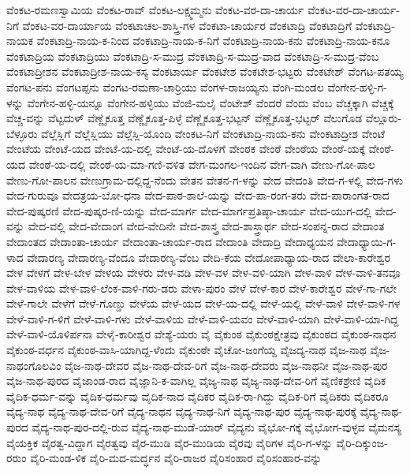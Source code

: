 ವೆಂಕಟ-ರಮಣಸ್ವಾಮಿಯ
ವೆಂಕಟ-ರಾವ್
ವೆಂಕಟ-ಲಕ್ಷ್ಮಮ್ಮನು
ವೆಂಕಟ-ವರ-ದಾ-ಚಾರ್ಯ
ವೆಂಕಟ-ವರ-ದಾ-ಚಾರ್ಯ-ನಿಗೆ
ವೆಂಕಟ-ವರ-ದಾರ್ಯಾಯ
ವೆಂಕಟಾಚಲ-ಶಾಸ್ತ್ರಿ-ಗಳ
ವೆಂಕಟಾ-ಚಾರ್ಯರ
ವೆಂಕಟಾದ್ರಿ
ವೆಂಕಟಾದ್ರಿಗೆ
ವೆಂಕಟಾದ್ರಿ-ನಾಯಕ
ವೆಂಕಟಾದ್ರಿ-ನಾಯ-ಕ-ನಿಂದ
ವೆಂಕಟಾದ್ರಿ-ನಾಯ-ಕ-ನಿಗೆ
ವೆಂಕಟಾದ್ರಿ-ನಾಯ-ಕನು
ವೆಂಕಟಾದ್ರಿ-ನಾಯ-ಕನೂ
ವೆಂಕಟಾದ್ರಿಯ
ವೆಂಕಟಾದ್ರಿಯು
ವೆಂಕಟಾದ್ರಿ-ಸ-ಮುದ್ರ
ವೆಂಕಟಾದ್ರಿ-ಸ-ಮುದ್ರ-ವಾದ
ವೆಂಕಟಾದ್ರಿ-ಸ-ಮುದ್ರ-ವೆಂಬ
ವೆಂಕಟಾದ್ರೀಶನ
ವೆಂಕಟಾದ್ರೀಶ-ನಾಯ-ಕಸ್ಯ
ವೆಂಕಟಾರ್ಯ
ವೆಂಕಟೇಶ
ವೆಂಕಟೇಶ-ಭಟ್ಟರು
ವೆಂಕಟೇಶ್
ವೆಂಗಟ-ಪತಯ್ಯ
ವೆಂಗಟ-ಪನು
ವೆಂಗಟಪ್ಪನು
ವೆಂಗಟ-ರಮಣಾ-ಚಾರ್ರಿಯು
ವೆಂಗಳ-ರಾಜಯ್ಯನು
ವೆಂಗಿ-ಮಂಡಲ
ವೆಂಗೇನ-ಹಳ್ಳಿ-ಗ-ಳನ್ನು
ವೆಂಗೇನ-ಹಳ್ಳಿ-ಯನ್ನೂ
ವೆಂಗೇನ-ಹಳ್ಳಿಯು
ವೆಂಜಿ-ಮಲೈ
ವೆಂಟೇಶ್
ವೆಂದರೆ
ವೆಂದು
ವೆಂಬ
ವೆಚ್ಚಕ್ಕಾಗಿ
ವೆಚ್ಚಕ್ಕೆ
ವೆಚ್ಚ-ವನ್ನು
ವೆಟ್ಟದುಳ್
ವೆಣ್ಣೈಕೂತ್ತ
ವೆಣ್ಣೈಕೂತ್ತ-ಪಿಳ್ಳೆ
ವೆಣ್ಣೈಕೂತ್ತ-ಭಟ್ಟನ್
ವೆಣ್ಣೈಕೂತ್ತ-ಭಟ್ಟರ್
ವೆಲುಗೊಡ
ವೆಲ್ಲೂರು-ಬೆಳ್ಳೂರು
ವೆಲ್ಲೆಸ್ಲಿಗೆ
ವೆಲ್ಲೆಸ್ಲಿಯು
ವೆಲ್ಲೆಸ್ಲಿ-ಯೊಂದಿ
ವೇಂಕಟ-ನಿಗೆ
ವೇಂಕಟಾದ್ರಿ-ನಾಯ-ಕನು
ವೇಂಕಟಾದ್ರೀಶ
ವೇಂಟೆ
ವೇಂಟೆಯ
ವೇಂಟೆ-ಯದ
ವೇಂಟೆ-ಯ-ದಲ್ಲಿ
ವೇಂಟೆ-ಯ-ದೊಳಗೆ
ವೇಂಠಕ
ವೇಂಠೆ
ವೇಂಠೆಯ
ವೇಂಠೆ-ಯಕ್ಕೆ
ವೇಂಠೆ-ಯದ
ವೇಂಠೆ-ಯ-ದಲ್ಲಿ
ವೇಂಠೆ-ಯ-ಮಾ-ಗಣಿ-ವಳಿತ
ವೇಗ-ಮಂಗಲ-ಇಂದಿನ
ವೇಗ-ವಾಗಿ
ವೇಣು-ಗೋ-ಪಾಲ
ವೇಣು-ಗೋ-ಪಾಲನ
ವೇಣುಗ್ರಾಮ-ದಲ್ಲಿದ್ದ-ನೆಂದು
ವೇತನ
ವೇತನ-ಗ-ಳನ್ನು
ವೇದ
ವೇದಂತಿ
ವೇದ-ಗ-ಳಲ್ಲಿ
ವೇದ-ಗಳು
ವೇದ-ಗುರುವೂ
ವೇದತ್ರಯ-ಬೋ-ಧನಾ
ವೇದ-ಪಾಠ-ಶಾಲೆ-ಯನ್ನು
ವೇದ-ಪಾ-ರಂಗ-ತರು
ವೇದ-ಪಾರಾಂಗತ-ರಾದ
ವೇದ-ಪುಷ್ಕರಣಿ
ವೇದ-ಪುಷ್ಕರ-ಣಿ-ಯನ್ನು
ವೇದ-ಮಾರ್ಗ
ವೇದ-ಮಾರ್ಗಪ್ರತಿಷ್ಠಾ-ಚಾರ್ಯ
ವೇದ-ಯುಗ-ದಲ್ಲಿ
ವೇದ-ವನ್ನು
ವೇದ-ವಲ್ಲಿ
ವೇದ-ವೇದಾಂಗ
ವೇದ-ವೇದಿನೇ
ವೇದ-ಶಾಸ್ತ್ರ
ವೇದ-ಶಾಸ್ತ್ರಾರ್ಥ
ವೇದ-ಸಂಪನ್ನ-ರಾದ
ವೇದಾಂತ
ವೇದಾಂತದ
ವೇದಾಂತಾ-ಚಾರ್ಯ
ವೇದಾಂತಾ-ಚಾರ್ಯ-ರಾದ
ವೇದಾಂತಿ
ವೇದಾದ್ರಿ
ವೇದಾಧ್ಯಯನ
ವೇದಾಧ್ಯಾಯಿ-ಗ-ಳಾದ
ವೇದಾರಣ್ಯ
ವೇದಾರಣ್ಯ-ವೆಂದೂ
ವೇದಾರಣ್ಯ-ವೆಂಬ
ವೇದಿ-ಕೆಯ
ವೇದೋಪಾಧ್ಯಾಯ-ರಾದ
ವೇಲಾ-ಕಾರೇಶ್ವರ
ವೇಳ
ವೇಳಗೆ
ವೇಳ-ಬೇಳ
ವೇಳಯ
ವೇಳರು
ವೇಳ-ವಡಿ
ವೇಳ-ವಳ
ವೇಳ-ವಳಿ-ಯಾಗಿ
ವೇಳ-ವಾಳಿ
ವೇಳ-ವಾಳಿ-ತನವೂ
ವೇಳ-ವಾಳಿಯ
ವೇಳ-ವಾಳಿ-ಲೆಂಕ-ವಾಳಿ-ಗರು-ಡರು
ವೇಳಾ-ಪುರಂ
ವೇಳೆ
ವೇಳೆ-ಕಾರ
ವೇಳೆ-ಕಾರೇಶ್ವರ
ವೇಳೆ-ಗಾ-ಗಲೇ
ವೇಳೆ-ಗಾಲೇ
ವೇಳೆಗೆ
ವೇಳೆ-ಗೊಣ್ಡು
ವೇಳೆಯ
ವೇಳೆ-ಯದ
ವೇಳೆ-ಯ-ದಲ್ಲಿ
ವೇಳೆ-ಯಲ್ಲಿ
ವೇಳೆ-ವಾಳಿ
ವೇಳೆ-ವಾಳಿ-ಗಳ
ವೇಳೆ-ವಾಳಿ-ಗ-ಳಿಗೆ
ವೇಳೆ-ವಾಳಿ-ಗಳು
ವೇಳೆ-ವಾಳಿಯ
ವೇಳೆ-ವಾಳಿ-ಯವಂ
ವೇಳೆ-ವಾಳಿ-ಯಾಗಿ
ವೇಳೆ-ವಾಳಿ-ಯಾ-ಗಿದ್ದ
ವೇಳೆ-ವಾಳಿ-ಯೊಳಿರ್ಪನಾ
ವೇಳೈ-ಕಾರೀಶ್ವರ
ವೇಶ್ಯೆ-ಯರು
ವೈ
ವೈಕುಂಠ
ವೈಕುಂಠಕ್ಷೇತ್ರವು
ವೈಕುಂಠದ
ವೈಕುಂಠ-ನಾಥನ
ವೈಕುಂಠ-ವರ್ಧನ
ವೈಕುಂಠ-ವಾಸಿ-ಯಾಗಿದ್ದ-ಳೆಂದು
ವೈಕುಂಠೇ
ವೈಚೋ-ಜಂಗೆಯ್ದ
ವೈಜದ್ಯ-ನಾಥ
ವೈಜ-ನಾಥ
ವೈಜ-ನಾಥಂಗೊಲವಿಂ
ವೈಜ-ನಾಥ-ದೇವರ
ವೈಜ-ನಾಥ-ದೇವ-ರಿಗೆ
ವೈಜ-ನಾಥ-ದೇವರು
ವೈಜ-ನಾಥನೀ
ವೈಜ-ನಾಥ-ಪುರ
ವೈಜ-ನಾಥ-ಪುರದ
ವೈಜಾಂಡ-ರಾದ
ವೈಜ್ಞಾನಿ-ಕ-ವಾಗಿಲ್ಲ
ವೈಜ್ಯ-ನಾಥ
ವೈಜ್ಯ-ನಾಥ-ದೇವ-ರಿಗೆ
ವೈಣಿಕಶ್ರೇಣಿ
ವೈದಿಕ
ವೈದಿಕ-ಧರ್ಮ-ವನ್ನು
ವೈದಿಕ-ಧರ್ಮವು
ವೈದಿಕ-ನಾದ
ವೈದಿಕರ
ವೈದಿಕ-ರಾ-ಗಿದ್ದು
ವೈದಿಕ-ರಿಗೆ
ವೈದಿಕರು
ವೈದಿಕರೂ
ವೈದ್ಯ-ನಾಥ
ವೈದ್ಯ-ನಾಥ-ದೇವ-ರಿಗೆ
ವೈದ್ಯ-ನಾಥನ
ವೈದ್ಯ-ನಾಥ-ನಿಗೆ
ವೈದ್ಯ-ನಾಥ-ಪುರ
ವೈದ್ಯ-ನಾಥ-ಪುರಕ್ಕೆ
ವೈದ್ಯ-ನಾಥ-ಪುರದ
ವೈದ್ಯ-ನಾಥ-ಪುರ-ದಲ್ಲಿ-ರುವ
ವೈದ್ಯ-ನಾಥ-ಮುಡೆ-ಯಾರ್
ವೈದ್ಯನು
ವೈಭೋ-ಗಕ್ಕೆ
ವೈಭೋಗ-ವುಳ್ಳವ
ವೈಮನಸ್ಯ
ವೈಯಕ್ತಿಕ
ವೈರತ್ವ-ವಿದ್ದಾಗ
ವೈರತ್ವವು
ವೈರ-ಮುಡಿ
ವೈರ-ಮುಡಿಯ
ವೈರವು
ವೈರಿಗಳ
ವೈರಿ-ಗ-ಳನ್ನು
ವೈರಿ-ದಿಕ್ಕುಂಜ-ರರುಂ
ವೈರಿ-ಮಂಡ-ಳಿಕ
ವೈರಿ-ಮದ-ಮರ್ದ್ಧನ
ವೈರಿ-ರಾಜರ
ವೈರಿಸಂಹಾರ
ವೈರಿಸಂಹಾರ-ವನ್ನು
